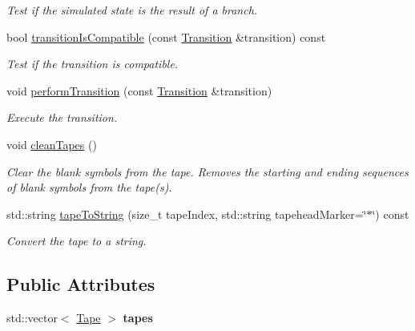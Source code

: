 \begin{DoxyCompactItemize}
\begin{DoxyCompactList}\small\item\em \-Test if the simulated state is the result of a branch. \end{DoxyCompactList}\item 
bool \hyperlink{classtum_1_1_simulated_state_a02c26525b4d73b1816ba7251bc662c22}{transition\-Is\-Compatible} (const \hyperlink{classtum_1_1_transition}{\-Transition} \&transition) const 
\begin{DoxyCompactList}\small\item\em \-Test if the transition is compatible. \end{DoxyCompactList}\item 
void \hyperlink{classtum_1_1_simulated_state_ac21febb2b891429c4b48db2cb00074b6}{perform\-Transition} (const \hyperlink{classtum_1_1_transition}{\-Transition} \&transition)
\begin{DoxyCompactList}\small\item\em \-Execute the transition. \end{DoxyCompactList}\item 
void \hyperlink{classtum_1_1_simulated_state_a0b47f6b259ff576e21a576f68a98249b}{clean\-Tapes} ()
\begin{DoxyCompactList}\small\item\em \-Clear the blank symbols from the tape.  \-Removes the starting and ending sequences of blank symbols from the tape(s). \end{DoxyCompactList}\item 
std\-::string \hyperlink{classtum_1_1_simulated_state_a12b2024769f67e5a33a1c817c4e0a079}{tape\-To\-String} (size\-\_\-t tape\-Index, std\-::string tapehead\-Marker=\char`\"{}$\ast$\char`\"{}) const 
\begin{DoxyCompactList}\small\item\em \-Convert the tape to a string. \end{DoxyCompactList}\end{DoxyCompactItemize}
\subsection*{\-Public \-Attributes}
\begin{DoxyCompactItemize}
\item 
\hypertarget{classtum_1_1_simulated_state_a36006332a23f86515c3b38f8ceeb17be}{std\-::vector$<$ \hyperlink{classtum_1_1_tape}{\-Tape} $>$ {\bfseries tapes}}\label{classtum_1_1_simulated_state_a36006332a23f86515c3b38f8ceeb17be}

\end{DoxyCompactItemize}


